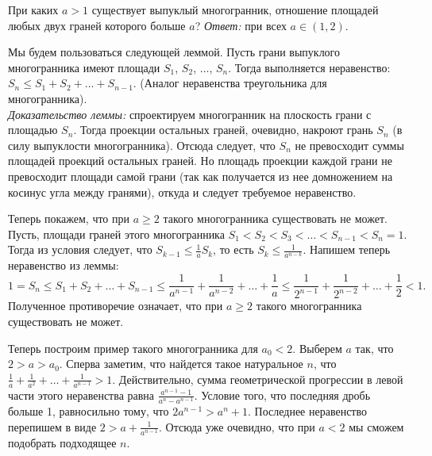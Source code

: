 \problem
При каких $a > 1$ существует выпуклый многогранник, отношение площадей любых
двух граней которого больше $a$?
\solution
\emph{Ответ:} при всех $a \in (1, 2)$.
\par
Мы будем пользоваться следующей леммой. 
Пусть грани выпуклого многогранника имеют площади
$S_1$, $S_2$, $\ldots$, $S_n$.
Тогда выполняется неравенство: $S_n \leq S_1 + S_2 + \ldots + S_{n-1}$.
(Аналог неравенства треугольника для многогранника).
\\\emph{Доказательство леммы:}
спроектируем многогранник на плоскость грани с площадью $S_n$.
Тогда проекции остальных граней, очевидно, накроют грань $S_n$
(в силу выпуклости многогранника).
Отсюда следует, что $S_n$ не превосходит суммы площадей проекций остальных
граней.
Но площадь проекции каждой грани не превосходит площади самой грани
(так как получается из нее домножением на косинус угла между гранями),
откуда и следует требуемое неравенство.
\par
Теперь покажем, что при $a \geq 2$ такого многогранника существовать не может.
Пусть, площади граней этого многогранника
$S_1 < S_2 < S_3 < \ldots < S_{n-1} < S_n = 1$.
Тогда из условия следует, что $S_{k-1} \leq \frac{1}{a} S_k$, то есть
$S_k \leq \frac{1}{a^{n-k}}$.
Напишем теперь неравенство из леммы:
\[
    1
=
    S_n \leq S_1 + S_2 + \ldots + S_{n-1}
\leq
    \frac{1}{a^{n-1}} + \frac{1}{a^{n-2}}
    + \ldots +
    \frac{1}{a}
\leq
    \frac{1}{2^{n-1}} + \frac{1}{2^{n-2}}
    + \ldots +
    \frac{1}{2}
<
    1
.\]
Полученное противоречие означает, что при $a \geq 2$ такого
многогранника существовать не может.
\par
Теперь построим пример такого многогранника для $a_0 < 2$.
Выберем $a$ так, что $2 > a > a_0$.
Сперва заметим, что найдется такое натуральное $n$, что
$\frac{1}{a} + \frac{1}{a^2} + \ldots + \frac{1}{a^{n-1}} > 1$.
Действительно, сумма геометрической прогрессии в левой части этого неравенства
равна $\frac{a^{n-1} - 1}{a^n - a^{n-1}}$.
Условие того, что последняя дробь больше 1, равносильно тому, что
$2 a^{n-1} > a^n + 1$.
Последнее неравенство перепишем в виде $2 > a + \frac{1}{a^{n-1}}$.
Отсюда уже очевидно, что при $a < 2$ мы сможем подобрать подходящее $n$.

